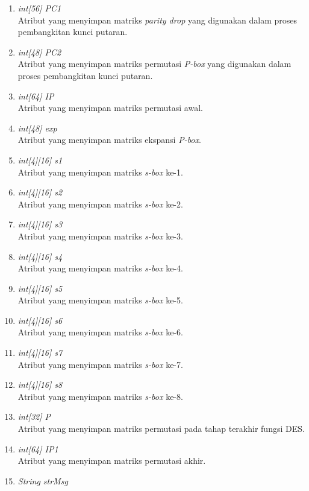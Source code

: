 \begin{enumerate}
	\item \textit{int[56] PC1} \\
	Atribut yang menyimpan matriks \textit{parity drop} yang digunakan dalam proses pembangkitan kunci putaran.
	\item \textit{int[48] PC2} \\
	Atribut yang menyimpan matriks permutasi \textit{P-box} yang digunakan dalam proses pembangkitan kunci putaran.
	\item \textit{int[64] IP} \\
	Atribut yang menyimpan matriks permutasi awal.
	\item \textit{int[48] exp} \\
	Atribut yang menyimpan matriks ekspansi \textit{P-box}.
	\item \textit{int[4][16] s1} \\
	Atribut yang menyimpan matriks \textit{s-box} ke-1.
	\item \textit{int[4][16] s2} \\
	Atribut yang menyimpan matriks \textit{s-box} ke-2.
	\item \textit{int[4][16] s3} \\
	Atribut yang menyimpan matriks \textit{s-box} ke-3.
	\item \textit{int[4][16] s4} \\
	Atribut yang menyimpan matriks \textit{s-box} ke-4.
	\item \textit{int[4][16] s5} \\
	Atribut yang menyimpan matriks \textit{s-box} ke-5.
	\item \textit{int[4][16] s6} \\
	Atribut yang menyimpan matriks \textit{s-box} ke-6.
	\item \textit{int[4][16] s7} \\
	Atribut yang menyimpan matriks \textit{s-box} ke-7.
	\item \textit{int[4][16] s8} \\
	Atribut yang menyimpan matriks \textit{s-box} ke-8.
	\item \textit{int[32] P} \\
	Atribut yang menyimpan matriks permutasi pada tahap terakhir fungsi DES.
	\item \textit{int[64] IP1} \\
	Atribut yang menyimpan matriks permutasi akhir.
	\item \textit{String strMsg} \\

\end{enumerate}
